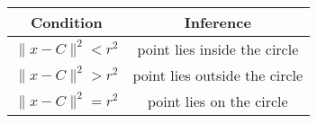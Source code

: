 \begin{tabular}[12pt]{ |c| c|}
    \hline
    \textbf{Condition} & \textbf{Inference} \\
    \hline
     $\|x - C\|^2 < r^2$ & point lies inside the circle \\ 
     \hline
     $\|x - C\|^2 > r^2$ & point lies outside the circle \\ 
     \hline
     $\|x - C\|^2 = r^2$ & point lies on the circle \\ 
     \hline  
    \end{tabular}
